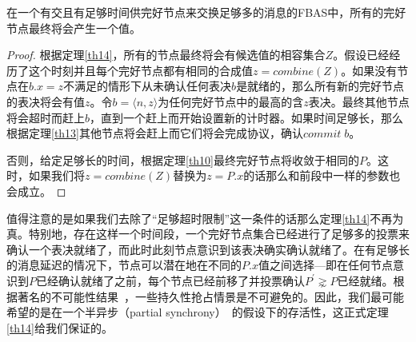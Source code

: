 \begin{theorem}\label{th14}
        在一个有{\quorum}交且有足够时间供完好节点来交换足够多的消息的FBAS中，所有的完好节点最终将会产生一个值。
\end{theorem}

\begin{proof}
        根据定理\ref{th14}，所有的节点最终将会有候选值的相容集合$Z$。假设已经经历了这个时刻并且每个完好节点都有相同的合成值$z=combine(Z)$。如果没有节点在$b.x=z$不满足的情形下从未确认任何表决$b$是就绪的，那么所有新的完好节点的表决将会有值$z$。令$b=\langle n,z\rangle$为任何完好节点中的最高的含$z$表决。最终其他节点将会超时而赶上$b$，直到一个{\quorum}赶上而开始设置新的计时器。如果时间足够长，那么根据定理\ref{th13}其他节点将会赶上而它们将会完成协议，确认$commit\;b$。
        
        否则，给定足够长的时间，根据定理\ref{th10}最终完好节点将收敛于相同的$P$。这时，如果我们将$z=combine(Z)$替换为$z=P.x$的话那么和前段中一样的参数也会成立。
\end{proof}

值得注意的是如果我们去除了``足够超时限制''这一条件的话那么定理\ref{th14}不再为真。特别地，存在这样一个时间段，一个完好节点集合已经进行了足够多的投票来确认一个表决就绪了，而此时此刻节点意识到该表决确实确认就绪了。在有足够长的消息延迟的情况下，节点可以潜在地在不同的$P.x$值之间选择---即在任何节点意识到$P$已经确认就绪了之前，每个节点已经前移了并投票确认$P^{\prime}\gnsim P$已经就绪。根据著名的不可能性结果~\cite{Fischer:1985:IDC:3149.214121}，一些持久性抢占情景是不可避免的。因此，我们最可能希望的是在一个半异步（partial synchrony）~\cite{Dwork:1988:CPP:42282.42283}的假设下的存活性，这正式定理\ref{th14}给我们保证的。